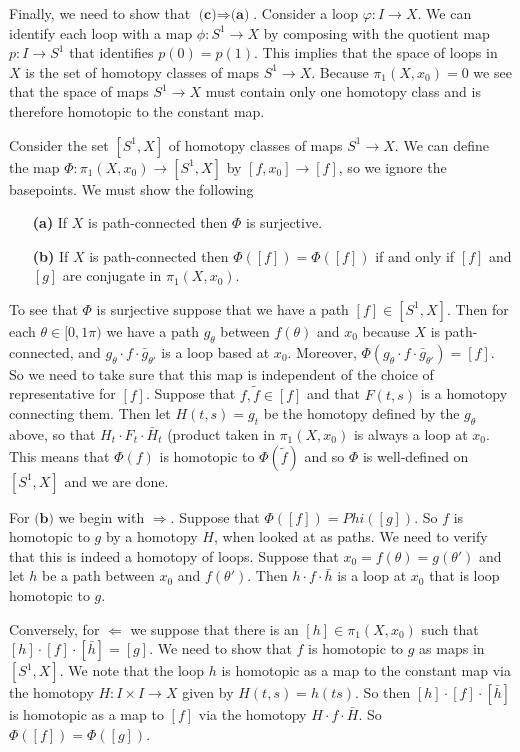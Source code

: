 \documentclass{article}
\newcommand{\exercise}[1]{\noindent{\textbf{Exercise #1:}}}
\begin{document}
Finally, we need to show that $\textbf{(c)} \Rightarrow
\textbf{(a)}$. Consider a loop $\varphi: I \to X$. We can identify
each loop with a map $\phi: S^1 \to X$ by composing with the quotient
map $p: I \to S^1$ that identifies $p(0) = p(1)$. This implies that
the space of loops in $X$ is the set of homotopy classes of maps $S^1
\to X$. Because $\pi_1(X,x_0) = 0$ we see that the space of maps $S^1
\to X$ must contain only one homotopy class and is therefore homotopic
to the constant map.

\exercise{1.1.6}

Consider the set $[S^1,X]$ of homotopy classes of maps $S^1 \to X$. We
can define the map $\Phi: \pi_1(X,x_0) \to [S^1,X]$ by $[f,x_0] \to
[f]$, so we ignore the basepoints. We must show the following
\begin{enumerate}
\item[\textbf{(a)}] If $X$ is path-connected then $\Phi$ is surjective.
\item[\textbf{(b)}] If $X$ is path-connected then $\Phi([f]) =
  \Phi([f])$ if and only if $[f]$ and $[g]$ are conjugate in
  $\pi_1(X,x_0)$.
\end{enumerate}
To see that $\Phi$ is surjective suppose that we have a path $[f] \in
[S^1,X]$. Then for each $\theta \in [0,1\pi)$ we have a path
$g_\theta$ between $f(\theta)$ and $x_0$ because $X$ is
path-connected, and $g_\theta\cdot f\cdot \bar{g}_{\theta'}$ is a loop based
at $x_0$. Moreover, $\Phi(g_{\theta}\cdot f\cdot \bar{g}_{\theta'}) = [f]$. So
we need to take sure that this map is independent of the choice of
representative for $[f]$. Suppose that $f,\tilde{f} \in [f]$ and that
$F(t,s)$ is a homotopy connecting them. Then let $H(t,s) = g_t$ be the
homotopy defined by the $g_\theta$ above, so that $H_t \cdot F_t \cdot
\bar{H}_t$ (product taken in $\pi_1(X,x_0)$ is always a loop at
$x_0$. This means that $\Phi(f)$ is homotopic to $\Phi(\tilde{f})$ and
so $\Phi$ is well-defined on $[S^1,X]$ and we are done.

For $\textbf{(b)}$ we begin with $\Rightarrow$. Suppose that
$\Phi([f]) = Phi([g])$. So $f$ is homotopic to $g$ by a homotopy $H$,
when looked at as paths. We need to verify that this is indeed a
homotopy of loops. Suppose that $x_0 = f(\theta) = g(\theta')$ and let
$h$ be a path between $x_0$ and $f(\theta')$. Then $h\cdot f\cdot
\bar{h}$ is a loop at $x_0$ that is loop homotopic to $g$.

Conversely, for $\Leftarrow$ we suppose that there is an $[h] \in
\pi_1(X,x_0)$ such that $[h]\cdot [f]\cdot [\bar{h}] = [g]$. We need
to show that $f$ is homotopic to $g$ as maps in $[S^1,X]$. We note
that the loop $h$ is homotopic as a map to the constant map via the
homotopy $H: I\times I \to X$ given by $H(t,s) = h(ts)$. So then $[h]
\cdot[f]\cdot [\bar{h}]$ is homotopic as a map to $[f]$ via the
homotopy $H \cdot f \cdot \bar{H}$. So $\Phi([f]) = \Phi([g])$.
\end{document}
